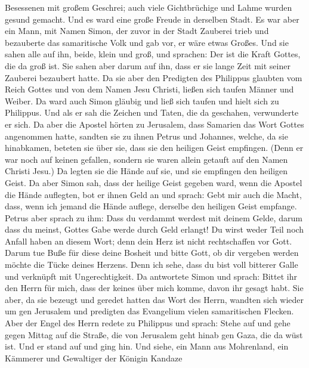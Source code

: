 Besessenen mit großem Geschrei; auch viele Gichtbrüchige und Lahme
wurden gesund gemacht.  Und es ward eine große Freude in
derselben Stadt.  Es war aber ein Mann, mit Namen Simon, der
zuvor in der Stadt Zauberei trieb und bezauberte das samaritische Volk
und gab vor, er wäre etwas Großes.  Und sie sahen alle auf
ihn, beide, klein und groß, und sprachen: Der ist die Kraft Gottes, die
da groß ist.  Sie sahen aber darum auf ihn, dass er sie
lange Zeit mit seiner Zauberei bezaubert hatte.  Da sie
aber den Predigten des Philippus glaubten vom Reich Gottes und von dem
Namen Jesu Christi, ließen sich taufen Männer und Weiber. 
Da ward auch Simon gläubig und ließ sich taufen und hielt sich zu
Philippus. Und als er sah die Zeichen und Taten, die da geschahen,
verwunderte er sich.  Da aber die Apostel hörten zu
Jerusalem, dass Samarien das Wort Gottes angenommen hatte, sandten sie
zu ihnen Petrus und Johannes,  welche, da sie hinabkamen,
beteten sie über sie, dass sie den heiligen Geist empfingen.
 (Denn er war noch auf keinen gefallen, sondern sie waren
allein getauft auf den Namen Christi Jesu.)  Da legten sie
die Hände auf sie, und sie empfingen den heiligen Geist. 
Da aber Simon sah, dass der heilige Geist gegeben ward, wenn die Apostel
die Hände auflegten, bot er ihnen Geld an  und sprach: Gebt
mir auch die Macht, dass, wenn ich jemand die Hände auflege, derselbe
den heiligen Geist empfange.  Petrus aber sprach zu ihm:
Dass du verdammt werdest mit deinem Gelde, darum dass du meinst, Gottes
Gabe werde durch Geld erlangt!  Du wirst weder Teil noch
Anfall haben an diesem Wort; denn dein Herz ist nicht rechtschaffen vor
Gott.  Darum tue Buße für diese deine Bosheit und bitte
Gott, ob dir vergeben werden möchte die Tücke deines Herzens.
 Denn ich sehe, dass du bist voll bitterer Galle und
verknüpft mit Ungerechtigkeit.  Da antwortete Simon und
sprach: Bittet ihr den Herrn für mich, dass der keines über mich komme,
davon ihr gesagt habt.  Sie aber, da sie bezeugt und
geredet hatten das Wort des Herrn, wandten sich wieder um gen Jerusalem
und predigten das Evangelium vielen samaritischen Flecken. 
Aber der Engel des Herrn redete zu Philippus und sprach: Stehe auf und
gehe gegen Mittag auf die Straße, die von Jerusalem geht hinab gen Gaza,
die da wüst ist.  Und er stand auf und ging hin. Und siehe,
ein Mann aus Mohrenland, ein Kämmerer und Gewaltiger der Königin Kandaze
